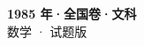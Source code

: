 \documentclass[zihao=-4, a4paper]{ctexart}
\begin{document}
\begin{center}
  {\Large\bfseries 1985 年·全国卷·文科}\\[4pt]
  {\large 数学 · 试题版}
\end{center}
\medskip
{}

\end{document}
